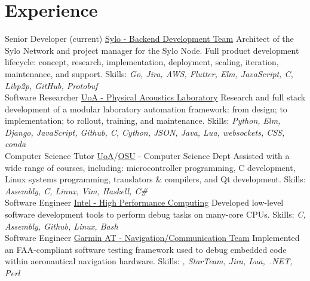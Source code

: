 \documentclass[a4paper]{twentysecondcv}
\begin{document}
\makeprofile{}

\section{Experience}
\begin{twenty}
           {}
           {Senior Developer (current)}
           {\href{https://sylo.io/}{Sylo - Backend Development Team}}
           {}
           {Architect of the Sylo Network and project manager for the Sylo Node.
           Full product development lifecycle: concept, research, implementation,
           deployment, scaling, iteration, maintenance, and support.
           Skills: \emph{Go, Jira, AWS, Flutter, Elm, JavaScript, C, Libp2p, GitHub,
           Protobuf}} \\

           {}
           {Software Researcher}
           {\href{https://pal.auckland.ac.nz/}{UoA - Physical Acoustics Laboratory}}
           {}
           {Research and full stack development of a modular laboratory automation
           framework: from design; to implementation; to rollout, training, and
           maintenance.
           Skills: \emph{Python, Elm, Django, JavaScript, Github, C, Cython, JSON,
           Java, Lua, websockets, CSS, conda}} \\

           {}
           {Computer Science Tutor}
           {\href{http://www.auckland.ac.nz/}{UoA}/\href{http://www.oregonstate.edu/}{OSU} - Computer Science Dept}
           {}
           {Assisted with a wide range of courses, including: microcontroller
           programming, C development, Linux systems programming, translators
           \& compilers, and Qt development.
           Skills: \emph{Assembly, C, Linux, Vim, Haskell, C\#}} \\

           {}
           {Software Engineer}
           {\href{https://www.intel.com}{Intel - High Performance Computing}}
           {}
           {Developed low-level software development tools to perform debug
           tasks on many-core CPUs.
           Skills: \emph{C, Assembly, Github, Linux, Bash}} \\

           {}
           {Software Engineer}
           {\href{http://www.garmin.com}{Garmin AT - Navigation/Communication Team}}
           {}
           {Implemented an FAA-compliant software testing framework used to
           debug embedded code within aeronautical navigation hardware.
           Skills: \emph{\CC, StarTeam, Jira, Lua,~.NET, Perl}} \\


\end{twenty}
\end{document}
